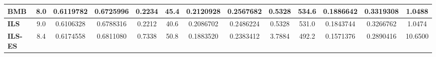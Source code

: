 \begin{table}[H]
\begin{adjustwidth}{-1cm}{-1cm}
\begin{tabular}{|l|c|c|c|c|c|c|c|c|c|c|c|c|}
	\textbf{BMB}     	& 8.0	& 0.6119782	& 0.6725996	& 0.2234	& 45.4	& 0.2120928	& 0.2567682 &	0.5328	& 534.6	& 0.1886642 &	0.3319308 &	1.0488		\\ \hline
	\textbf{ILS}   	 	&  9.0&	0.6106328	&0.6788316	&0.2212&	40.6	&0.2086702	&0.2486224	&0.5328	&531.0	&0.1843744	&0.3266762 &	1.0474		\\ \hline
	\textbf{ILS-ES}   	& 8.4&	0.6174558	&0.6811080&	0.7338&	50.8	&0.1883520	&0.2383412	&3.7884&	492.2	&0.1571376	&0.2890416	&10.6500	\\ \hline
	\end{tabular}
	
	\end{adjustwidth}
	
\end{table}	

\begin{table}[H]
	\tiny

	\begin{adjustwidth}{-1cm}{-1cm}%
	

\end{adjustwidth}
\end{table}
